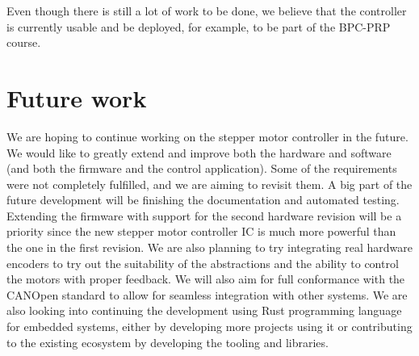 Even though there is still a lot of work to be done, we believe that the controller is currently usable and be deployed, for example, to be part of the BPC-PRP course.

\section{Future work}
\label{sec:fut_job}
We are hoping to continue working on the stepper motor controller in the future.
We would like to greatly extend and improve both the hardware and software (and both the firmware and the control application).
Some of the requirements were not completely fulfilled, and we are aiming to revisit them.
A big part of the future development will be finishing the documentation and automated testing.
Extending the firmware with support for the second hardware revision will be a priority since the new stepper motor controller IC is much more powerful than the one in the first revision.
We are also planning to try integrating real hardware encoders to try out the suitability of the abstractions and the ability to control the motors with proper feedback.
We will also aim for full conformance with the CANOpen standard to allow for seamless integration with other systems.
We are also looking into continuing the development using Rust programming language for embedded systems, either by developing more projects using it or contributing to the existing ecosystem by developing the tooling and libraries.
